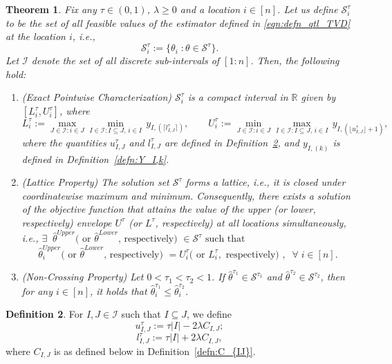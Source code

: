 \documentclass[11pt]{article}
\newcommand{\I}{\mathcal{I}}
\newcommand{\cS}{\mathcal{S}}
\newcommand{\bR}{\mathbb{R}}
\theoremstyle{plain}
\newtheorem{theorem}{Theorem}[section]
\theoremstyle{definition}
\newtheorem{definition}[theorem]{Definition}
\theoremstyle{remark}
\begin{document}
\begin{theorem}\label{thm:minmax_bound}
    Fix any $\tau\in (0,1)$, $\lambda\geq 0$ and a location $i\in [n]$. Let us define $\cS^{\tau}_i$ to be the set of all feasible values of the estimator defined in \eqref{eqn:defn_qtl_TVD} at the location $i$, i.e., 
    \[\mathcal{S}^{\tau}_i:=\{\theta_i\;:\theta \in \cS^{\tau}\}.\]
    Let $\I$ denote the set of all discrete sub-intervals of $[1:n]$. 
    Then, the following hold:
    \begin{enumerate}
        \item [(1)] (Exact Pointwise Characterization) \(\cS^{\tau}_i\) is a compact interval in $\bR$ given by \([L_i^{\tau},U_i^{\tau}]\), where
        \begin{equation} \label{eqn:minmax_bound_qtl}
  L^{\tau}_i:=\max_{J\in \I: i \in J}\min_{I\in \I: I\subseteq J,\, i \in I}\,y_{I,(\lceil l^{\tau}_{I,J}\rceil)},\qquad U^{\tau}_i:= \min_{J\in \I: i \in J}\max_{I\in \I: I\subseteq J,\, i \in I}\, y_{I,(\lfloor u^{\tau}_{I,J}\rfloor+1)},
 \end{equation}
  where the quantities $u^{\tau}_{I,J}$ and $l^{\tau}_{I,J}$ are defined in Definition~\ref{defn:u_ij_l_ij}, and $y_{I,(k)}$ is defined in Definition~\ref{defn:Y_I,k}.
 \item [(2)] (Lattice Property) The solution set $\mathcal{S}^{\tau}$ forms a lattice, i.e., it is closed under coordinatewise maximum and minimum. Consequently, there exists a solution of the objective function that attains the value of the upper (or lower, respectively) envelope $U^{\tau}$ (or $L^{\tau}$, respectively) at all locations simultaneously, i.e., 
 $\exists\;\; \hat{\theta}^{Upper}(\text{ or }\hat{\theta}^{Lower}\text{, respectively) }\in \cS^{\tau}\text{ such that }$
 $$\hat{\theta}^{Upper}_i(\text{ or }\hat{\theta}^{Lower}\text{, respectively) }=U^{\tau}_i(\text{ or }L^{\tau}_i,\text{ respectively) },\;\;\forall\;i\in [n].$$
 \item [(3)] (Non-Crossing Property) Let $0<\tau_1< \tau_2<1$. If $\hat{\theta}^{\tau_1}\in\cS^{\tau_1}$ and $\hat{\theta}^{\tau_2}\in\cS^{\tau_2}$, then for any $i\in [n]$, it holds that $\hat{\theta}^{\tau_1}_i\leq \hat{\theta}^{\tau_2}_i$.
    \end{enumerate}   
\end{theorem}

\begin{definition}\label{defn:u_ij_l_ij}
For $I,J\in \I$ such that $I\subseteq J$, we define
    \[u^{\tau}_{I,J}:=\tau|I|-2\lambda C_{I,J};\]
\[l^{\tau}_{I,J}:=\tau|I|+2\lambda C_{I,J},\]
where $C_{I,J}$ is as defined below in Definition~\ref{defn:C_{IJ}}.
\end{definition}
\end{document}
